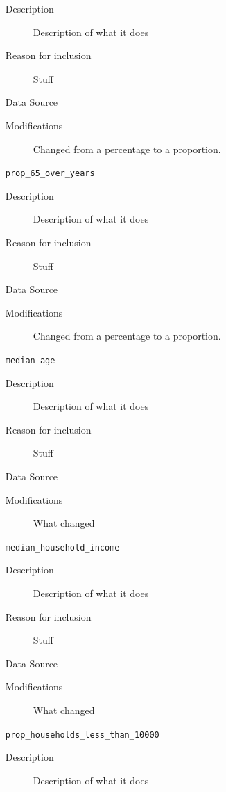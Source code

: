 \documentclass{article}
\begin{document}
\begin{itemize}[label={}, align=left]
          \begin{description}
              \item[Description] Description of what it does
              \item[Reason for inclusion] Stuff
              \item[Data Source] \cite{acs_demographics_data}
              \item[Modifications] Changed from a percentage to a proportion.
          \end{description}
    \item[\texttt{prop\_65\_over\_years}] \
          \begin{description}
              \item[Description] Description of what it does
              \item[Reason for inclusion] Stuff
              \item[Data Source] \cite{acs_demographics_data}
              \item[Modifications] Changed from a percentage to a proportion.
          \end{description}
    \item[\texttt{median\_age}] \
          \begin{description}
              \item[Description] Description of what it does
              \item[Reason for inclusion] Stuff
              \item[Data Source] \cite{acs_demographics_data}
              \item[Modifications] What changed
          \end{description}
    \item[\texttt{median\_household\_income}] \
          \begin{description}
              \item[Description] Description of what it does
              \item[Reason for inclusion] Stuff
              \item[Data Source] \cite{acs_income_data}
              \item[Modifications] What changed
          \end{description}
    \item[\texttt{prop\_households\_less\_than\_10000}] \
          \begin{description}
              \item[Description] Description of what it does

\end{description}
\end{itemize}
\end{document}
